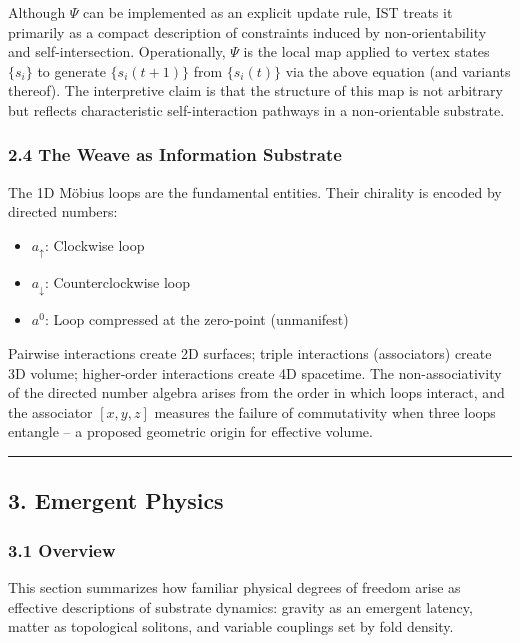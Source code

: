 \documentclass[
]{article}
\providecommand{\tightlist}{%
  \setlength{\itemsep}{0pt}\setlength{\parskip}{0pt}}
\begin{document}
Although \(\Psi\) can be implemented as an explicit update rule, IST
treats it primarily as a compact description of constraints induced by
non-orientability and self-intersection. Operationally, \(\Psi\) is the
local map applied to vertex states \(\{s_i\}\) to generate
\(\{s_i(t+1)\}\) from \(\{s_i(t)\}\) via the above equation (and
variants thereof). The interpretive claim is that the structure of this
map is not arbitrary but reflects characteristic self-interaction
pathways in a non-orientable substrate.

\subsubsection{2.4 The Weave as Information
Substrate}\label{the-weave-as-information-substrate}

The 1D Möbius loops are the fundamental entities. Their chirality is
encoded by directed numbers:

\begin{itemize}
\tightlist
\item
  \textbf{\(a_{\uparrow}\)}: Clockwise loop
\item
  \textbf{\(a_{\downarrow}\)}: Counterclockwise loop
\item
  \textbf{\(a^0\)}: Loop compressed at the zero-point (unmanifest)
\end{itemize}

Pairwise interactions create 2D surfaces; triple interactions
(associators) create 3D volume; higher-order interactions create 4D
spacetime. The non-associativity of the directed number algebra arises
from the order in which loops interact, and the associator \([x, y, z]\)
measures the failure of commutativity when three loops entangle -- a
proposed geometric origin for effective volume.

\begin{center}\rule{0.5\linewidth}{0.5pt}\end{center}

\subsection{3. Emergent Physics}\label{emergent-physics}

\subsubsection{3.1 Overview}\label{overview}

This section summarizes how familiar physical degrees of freedom arise
as effective descriptions of substrate dynamics: gravity as an emergent
latency, matter as topological solitons, and variable couplings set by
fold density.
\end{document}
